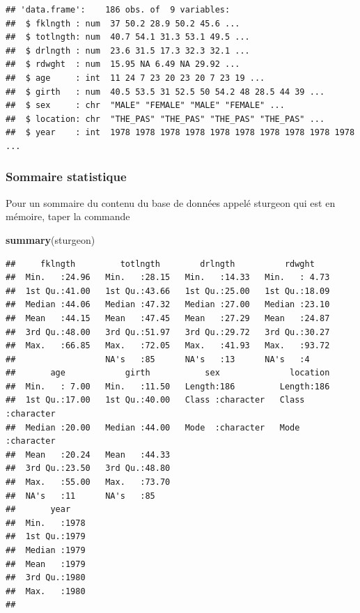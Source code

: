 \documentclass[12pt,]{book}
\newenvironment{Shaded}{\begin{snugshade}}{\end{snugshade}}
\newcommand{\KeywordTok}[1]{\textcolor[rgb]{0.13,0.29,0.53}{\textbf{#1}}}
\newcommand{\NormalTok}[1]{#1}
\begin{document}
\begin{verbatim}
## 'data.frame':    186 obs. of  9 variables:
##  $ fklngth : num  37 50.2 28.9 50.2 45.6 ...
##  $ totlngth: num  40.7 54.1 31.3 53.1 49.5 ...
##  $ drlngth : num  23.6 31.5 17.3 32.3 32.1 ...
##  $ rdwght  : num  15.95 NA 6.49 NA 29.92 ...
##  $ age     : int  11 24 7 23 20 23 20 7 23 19 ...
##  $ girth   : num  40.5 53.5 31 52.5 50 54.2 48 28.5 44 39 ...
##  $ sex     : chr  "MALE" "FEMALE" "MALE" "FEMALE" ...
##  $ location: chr  "THE_PAS" "THE_PAS" "THE_PAS" "THE_PAS" ...
##  $ year    : int  1978 1978 1978 1978 1978 1978 1978 1978 1978 1978 ...
\end{verbatim}

\hypertarget{sommaire-statistique}{%
\subsubsection{Sommaire statistique}\label{sommaire-statistique}}

Pour un sommaire du contenu du base de données appelé sturgeon qui est en mémoire, taper la commande

\begin{Shaded}
\begin{Highlighting}[]
\KeywordTok{summary}\NormalTok{(sturgeon)}
\end{Highlighting}
\end{Shaded}

\begin{verbatim}
##     fklngth         totlngth        drlngth          rdwght     
##  Min.   :24.96   Min.   :28.15   Min.   :14.33   Min.   : 4.73  
##  1st Qu.:41.00   1st Qu.:43.66   1st Qu.:25.00   1st Qu.:18.09  
##  Median :44.06   Median :47.32   Median :27.00   Median :23.10  
##  Mean   :44.15   Mean   :47.45   Mean   :27.29   Mean   :24.87  
##  3rd Qu.:48.00   3rd Qu.:51.97   3rd Qu.:29.72   3rd Qu.:30.27  
##  Max.   :66.85   Max.   :72.05   Max.   :41.93   Max.   :93.72  
##                  NA's   :85      NA's   :13      NA's   :4      
##       age            girth           sex              location        
##  Min.   : 7.00   Min.   :11.50   Length:186         Length:186        
##  1st Qu.:17.00   1st Qu.:40.00   Class :character   Class :character  
##  Median :20.00   Median :44.00   Mode  :character   Mode  :character  
##  Mean   :20.24   Mean   :44.33                                        
##  3rd Qu.:23.50   3rd Qu.:48.80                                        
##  Max.   :55.00   Max.   :73.70                                        
##  NA's   :11      NA's   :85                                           
##       year     
##  Min.   :1978  
##  1st Qu.:1979  
##  Median :1979  
##  Mean   :1979  
##  3rd Qu.:1980  
##  Max.   :1980  
## 
\end{verbatim}
\end{document}
